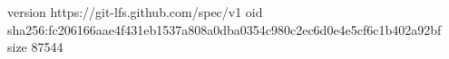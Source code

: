 version https://git-lfs.github.com/spec/v1
oid sha256:fc206166aae4f431eb1537a808a0dba0354c980c2ec6d0e4e5cf6c1b402a92bf
size 87544
